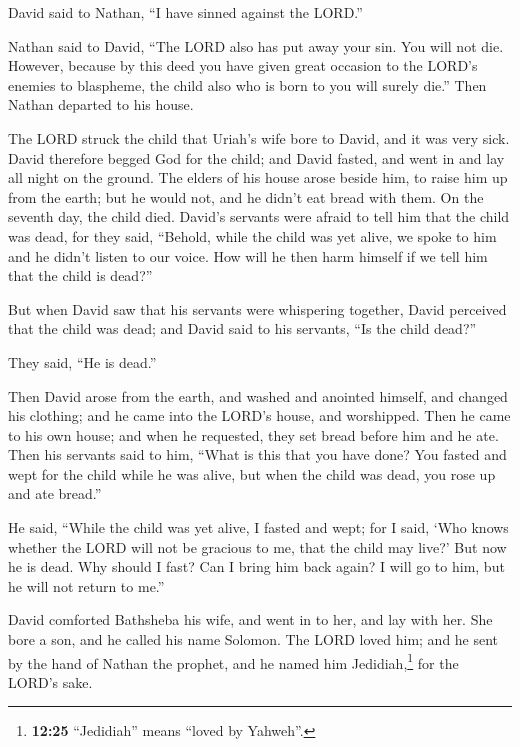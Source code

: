  David said to Nathan, ``I have sinned against the
LORD.''

Nathan said to David, ``The LORD also has put away your sin. You will
not die.  However, because by this deed you have given
great occasion to the LORD's enemies to blaspheme, the child also who is
born to you will surely die.''  Then Nathan departed to
his house.

The LORD struck the child that Uriah's wife bore to David, and it was
very sick.  David therefore begged God for the child; and
David fasted, and went in and lay all night on the ground.
 The elders of his house arose beside him, to raise him
up from the earth; but he would not, and he didn't eat bread with them.
 On the seventh day, the child died. David's servants
were afraid to tell him that the child was dead, for they said,
``Behold, while the child was yet alive, we spoke to him and he didn't
listen to our voice. How will he then harm himself if we tell him that
the child is dead?''

 But when David saw that his servants were whispering
together, David perceived that the child was dead; and David said to his
servants, ``Is the child dead?''

They said, ``He is dead.''

 Then David arose from the earth, and washed and anointed
himself, and changed his clothing; and he came into the LORD's house,
and worshipped. Then he came to his own house; and when he requested,
they set bread before him and he ate.  Then his servants
said to him, ``What is this that you have done? You fasted and wept for
the child while he was alive, but when the child was dead, you rose up
and ate bread.''

 He said, ``While the child was yet alive, I fasted and
wept; for I said, `Who knows whether the LORD will not be gracious to
me, that the child may live?'  But now he is dead. Why
should I fast? Can I bring him back again? I will go to him, but he will
not return to me.''

 David comforted Bathsheba his wife, and went in to her,
and lay with her. She bore a son, and he called his name Solomon. The
LORD loved him;  and he sent by the hand of Nathan the
prophet, and he named him Jedidiah,\footnote{\textbf{12:25} ``Jedidiah''
  means ``loved by Yahweh''.} for the LORD's sake.

